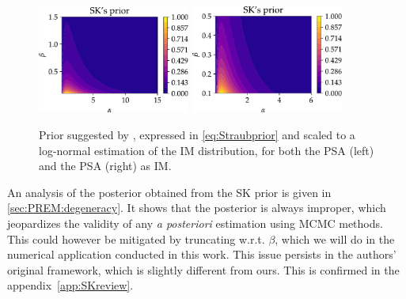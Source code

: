 \begin{figure}[h]
    \centering
    \includegraphics[width=5cm]{figures/PREM/SK_prior_PSA.pdf}\hspace*{0.5cm}
    \includegraphics[width=5cm]{figures/PREM/SK_prior_PGA.pdf}
    \caption{Prior suggested by \citet{straub_improved_2008},  expressed in \cref{eq:Straubprior} and scaled to a log-normal estimation of the IM distribution, for both the PSA (left) and the PSA (right) as IM.}
    \label{fig:Straubprior}
\end{figure}


An analysis of the posterior obtained from the SK prior is given in \cref{sec:PREM:degeneracy}. It shows that the posterior is always improper, which jeopardizes the validity of any \emph{a posteriori} estimation using MCMC methods. This could however be mitigated by truncating w.r.t. $\beta$, which we will do in the numerical application conducted in this work. This issue persists in the authors' original framework, which is slightly different from ours. This is confirmed in the appendix~\ref{app:SKreview}.



